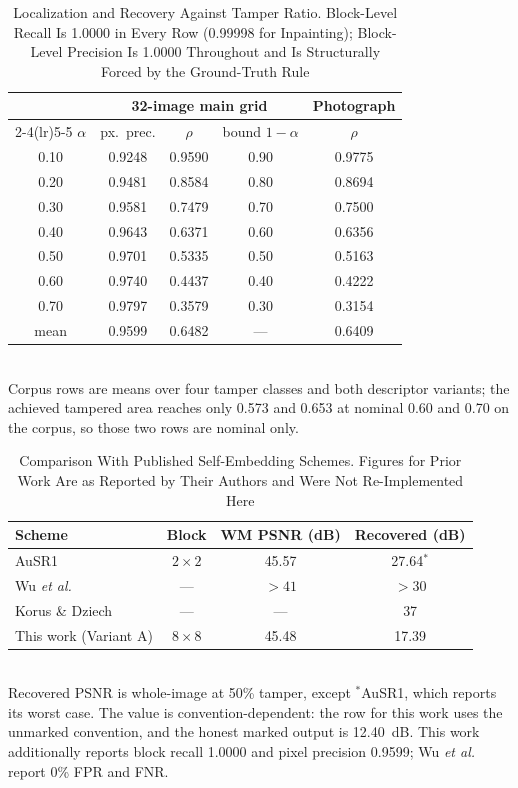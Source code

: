 \documentclass[conference]{IEEEtran}
\begin{document}
\begin{table}[t]
\caption{Localization and Recovery Against Tamper Ratio. Block-Level Recall Is
1.0000 in Every Row (0.99998 for Inpainting); Block-Level Precision Is 1.0000
Throughout and Is Structurally Forced by the Ground-Truth Rule}
\label{tab:results}
\centering
\begin{tabular}{ccccc}
\toprule
 & \multicolumn{3}{c}{32-image main grid} & Photograph \\
\cmidrule(lr){2-4}\cmidrule(lr){5-5}
$\alpha$ & px.\ prec. & $\rho$ & bound $1-\alpha$ & $\rho$ \\
\midrule
0.10 & 0.9248 & 0.9590 & 0.90 & 0.9775 \\
0.20 & 0.9481 & 0.8584 & 0.80 & 0.8694 \\
0.30 & 0.9581 & 0.7479 & 0.70 & 0.7500 \\
0.40 & 0.9643 & 0.6371 & 0.60 & 0.6356 \\
0.50 & 0.9701 & 0.5335 & 0.50 & 0.5163 \\
0.60 & 0.9740 & 0.4437 & 0.40 & 0.4222 \\
0.70 & 0.9797 & 0.3579 & 0.30 & 0.3154 \\
\midrule
mean & 0.9599 & 0.6482 & --- & 0.6409 \\
\bottomrule
\end{tabular}
\\[2pt]
\footnotesize Corpus rows are means over four tamper classes and both descriptor
variants; the achieved tampered area reaches only 0.573 and 0.653 at nominal 0.60
and 0.70 on the corpus, so those two rows are nominal only.
\end{table}

\begin{table}[t]
\caption{Comparison With Published Self-Embedding Schemes. Figures for Prior Work
Are as Reported by Their Authors and Were Not Re-Implemented Here}
\label{tab:compare}
\centering
\footnotesize
\begin{tabular}{@{}lccc@{}}
\toprule
Scheme & Block & WM PSNR (dB) & Recovered (dB) \\
\midrule
AuSR1 \cite{ausr1}                         & $2\times2$ & 45.57 & 27.64$^{\ast}$ \\
Wu \emph{et al.} \cite{wu2026multifeature} & ---        & $>41$ & $>30$ \\
Korus \& Dziech \cite{korus2013efficient}  & ---        & ---   & 37 \\
This work (Variant A)                      & $8\times8$ & 45.48 & 17.39 \\
\bottomrule
\end{tabular}
\\[2pt]
\footnotesize Recovered PSNR is whole-image at 50\% tamper, except $^{\ast}$AuSR1,
which reports its worst case. The value is convention-dependent: the row for this
work uses the unmarked convention, and the honest marked output is 12.40~dB. This
work additionally reports block recall 1.0000 and pixel precision 0.9599;
Wu \emph{et al.} report 0\% FPR and FNR.
\end{table}
\end{document}
